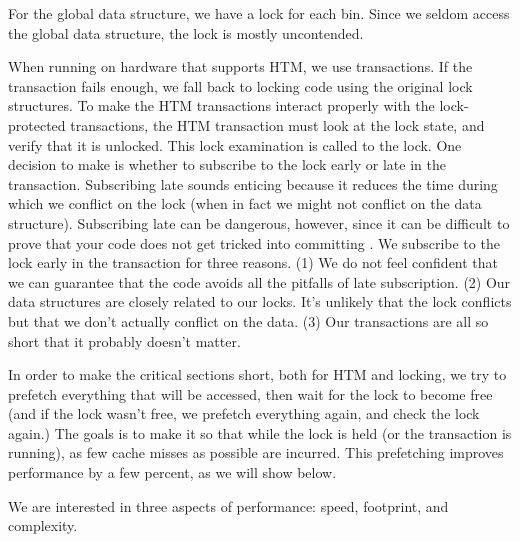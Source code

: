 \documentclass[pldi]{sigplanconf-pldi15}
\begin{document}
For the global data structure, we have a lock for each bin.  Since we
seldom access the global data structure, the lock is mostly
uncontended.

When running on hardware that supports HTM, we use transactions.  If
the transaction fails enough, we fall back to locking code using the
original lock structures.  To make the HTM transactions interact
properly with the lock-protected transactions, the HTM transaction
must look at the lock state, and verify that it is unlocked.  This
lock examination is called  to the lock.  One
decision to make is whether to subscribe to the lock early or late in
the transaction.  Subscribing late sounds enticing because it reduces
the time during which we conflict on the lock (when in fact we might
not conflict on the data structure).  Subscribing late can be
dangerous, however, since it can be difficult to prove that your code
does not get tricked into committing \cite{DiceHaKo14}.  We subscribe
to the lock early in the transaction for three reasons.  (1) We do not
feel confident that we can guarantee that the code avoids all the
pitfalls of late subscription.  (2) Our data structures are closely
related to our locks.  It's unlikely that the lock conflicts but that
we don't actually conflict on the data.  (3) Our transactions are all
so short that it probably doesn't matter.

In order to make the critical sections short, both for HTM and
locking, we try to prefetch everything that will be accessed, then
wait for the lock to become free (and if the lock wasn't free, we
prefetch everything again, and check the lock again.)  The goals is to
make it so that while the lock is held (or the transaction is
running), as few cache misses as possible are incurred.  This
prefetching improves performance by a few percent, as we will show
below.


We are interested in three aspects of performance: speed, footprint,
and complexity.
\end{document}
